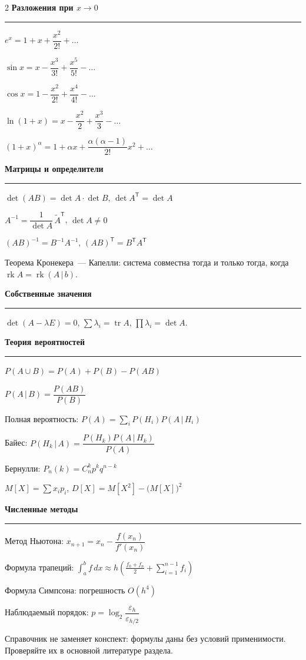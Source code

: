\documentclass[11pt, a4paper]{article}
\newcommand{\block}[1]{\vspace{0.6em}\textbf{#1}\vspace{0.25em}\hrule\vspace{0.5em}}
\begin{document}
\begin{multicols}{2}
\block{Разложения при $x \to 0$}

$e^x = 1 + x + \dfrac{x^2}{2!} + \dots$

$\sin x = x - \dfrac{x^3}{3!} + \dfrac{x^5}{5!} - \dots$

$\cos x = 1 - \dfrac{x^2}{2!} + \dfrac{x^4}{4!} - \dots$

$\ln(1+x) = x - \dfrac{x^2}{2} + \dfrac{x^3}{3} - \dots$

$(1+x)^{\alpha} = 1 + \alpha x + \dfrac{\alpha(\alpha-1)}{2!}x^2 + \dots$

\columnbreak

\block{Матрицы и определители}

$\det(AB) = \det A \cdot \det B$, \quad $\det A^{\mathsf T} = \det A$

$A^{-1} = \dfrac{1}{\det A}\,\widetilde{A}^{\mathsf T}$, \quad $\det A \ne 0$

$(AB)^{-1} = B^{-1}A^{-1}$, \quad $(AB)^{\mathsf T} = B^{\mathsf T}A^{\mathsf T}$

Теорема Кронекера~--- Капелли: система совместна тогда и только тогда,
когда $\operatorname{rk} A = \operatorname{rk}(A\,|\,b)$.

\block{Собственные значения}

$\det(A - \lambda E) = 0$, \quad
$\sum \lambda_i = \operatorname{tr} A$, \quad
$\prod \lambda_i = \det A$.

\block{Теория вероятностей}

$P(A \cup B) = P(A) + P(B) - P(AB)$

$P(A\,|\,B) = \dfrac{P(AB)}{P(B)}$

Полная вероятность: $P(A) = \sum_i P(H_i)P(A\,|\,H_i)$

Байес: $P(H_k\,|\,A) = \dfrac{P(H_k)P(A\,|\,H_k)}{P(A)}$

Бернулли: $P_n(k) = C_n^k p^k q^{n-k}$

$M[X] = \sum x_i p_i$, \quad
$D[X] = M[X^2] - \big(M[X]\big)^2$

\block{Численные методы}

Метод Ньютона: $x_{n+1} = x_n - \dfrac{f(x_n)}{f'(x_n)}$

Формула трапеций: $\displaystyle\int_a^b f\,dx \approx h\left(\frac{f_0 + f_n}{2} + \sum_{i=1}^{n-1} f_i\right)$

Формула Симпсона: погрешность $O(h^4)$

Наблюдаемый порядок: $p = \log_2 \dfrac{\varepsilon_h}{\varepsilon_{h/2}}$

\end{multicols}

\vfill
{\footnotesize Справочник не заменяет конспект: формулы даны без условий
применимости. Проверяйте их в основной литературе раздела.}
\end{document}
